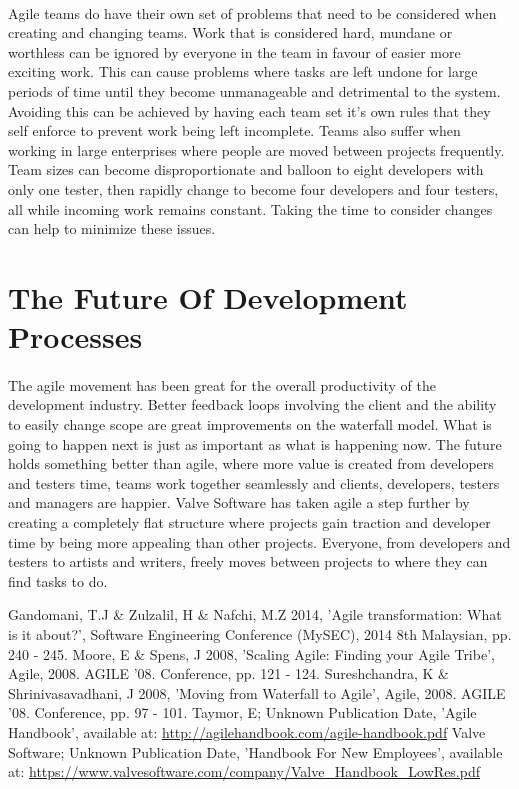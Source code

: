 \documentclass[11pt,twocolumn]{article}
\begin{document}
\paragraph{}
Agile teams do have their own set of problems that need to be considered when creating and changing teams.
Work that is considered hard, mundane or worthless can be ignored by everyone in the team in favour of easier more exciting work.
This can cause problems where tasks are left undone for large periods of time until they become unmanageable and detrimental to the system.
Avoiding this can be achieved by having each team set it's own rules that they self enforce to prevent work being left incomplete.
Teams also suffer when working in large enterprises where people are moved between projects frequently.
Team sizes can become disproportionate and balloon to eight developers with only one tester, then rapidly change to become four developers and four testers, all while incoming work remains constant.
Taking the time to consider changes can help to minimize these issues.

\section{The Future Of Development Processes}
\paragraph{}
The agile movement has been great for the overall productivity of the development industry.
Better feedback loops involving the client and the ability to easily change scope are great improvements on the waterfall model.
What is going to happen next is just as important as what is happening now.
The future holds something better than agile, where more value is created from developers and testers time, teams work together seamlessly and clients, developers, testers and managers are happier.
Valve Software has taken agile a step further by creating a completely flat structure where projects gain traction and developer time by being more appealing than other projects.
Everyone, from developers and testers to artists and writers, freely moves between projects to where they can find tasks to do.

\begin{thebibliography}{9}
\bibitem{} Gandomani, T.J \& Zulzalil, H \& Nafchi, M.Z 2014, 'Agile transformation: What is it about?', Software Engineering Conference (MySEC), 2014 8th Malaysian, pp. 240 - 245.
\bibitem{} Moore, E \& Spens, J 2008, 'Scaling Agile: Finding your Agile Tribe', Agile, 2008. AGILE '08. Conference, pp. 121 - 124.
\bibitem{} Sureshchandra, K \& Shrinivasavadhani, J 2008, 'Moving from Waterfall to Agile', Agile, 2008. AGILE '08. Conference, pp. 97 - 101.
\bibitem{} Taymor, E; Unknown Publication Date, 'Agile Handbook', available at: \url{http://agilehandbook.com/agile-handbook.pdf}
\bibitem{} Valve Software; Unknown Publication Date, 'Handbook For New Employees', available at: \url{https://www.valvesoftware.com/company/Valve\_Handbook\_LowRes.pdf}
\end{thebibliography}
\end{document}
